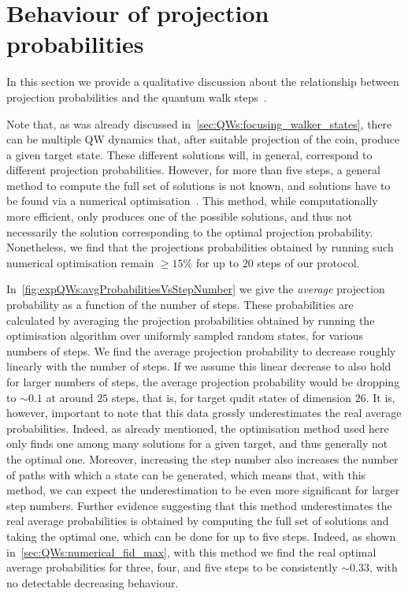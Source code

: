 \section{Behaviour of projection probabilities}
\label{sec:expQWs:projection_probs}

In this section we provide a qualitative discussion about the relationship between projection probabilities and the quantum walk steps~\cite{innocenti2017quantum}.

Note that, as was already discussed in~\cref{sec:QWs:focusing_walker_states}, there can be multiple \ac{QW} dynamics that, after suitable projection of the coin, produce a given target state.
These different solutions will, in general, correspond to different projection probabilities.
However, for more than five steps, a general method to compute the full set of solutions is not known, and solutions have to be found via a numerical optimisation~\cite{innocenti2017quantum}.
This method, while computationally more efficient, only produces one of the possible solutions, and thus not necessarily the solution corresponding to the optimal projection probability.
Nonetheless, we find that the projections probabilities obtained by running such numerical optimisation remain $\ge 15\%$ for up to $20$ steps of our protocol. 

In~\cref{fig:expQWs:avgProbabilitiesVsStepNumber} we give the \textit{average} projection probability as a function of the number of steps. These probabilities are calculated by averaging the projection probabilities obtained by running the optimisation algorithm over uniformly sampled random states, for various numbers of steps. We find the average projection probability to decrease roughly linearly with the number of steps. If we assume this linear decrease to also hold for larger numbers of steps, the average projection probability would be dropping to $\sim 0.1$ at around $25$ steps, that is, for target qudit states of dimension $26$.
It is, however, important to note that this data grossly underestimates the real average probabilities. Indeed, as already mentioned, the optimisation method used here only finds one among many solutions for a given target, and thus generally not the optimal one. Moreover, increasing the step number also increases the number of paths with which a state can be generated, which means that, with this method, we can expect the underestimation to be even more significant for larger step numbers.
Further evidence suggesting that this method underestimates the real average probabilities is obtained by computing the full set of solutions and taking the optimal one, which can be done for up to five steps. Indeed, as shown in~\cref{sec:QWs:numerical_fid_max}, with this method we find the real optimal average probabilities for three, four, and five steps to be consistently $\sim 0.33$, with no detectable decreasing behaviour.

